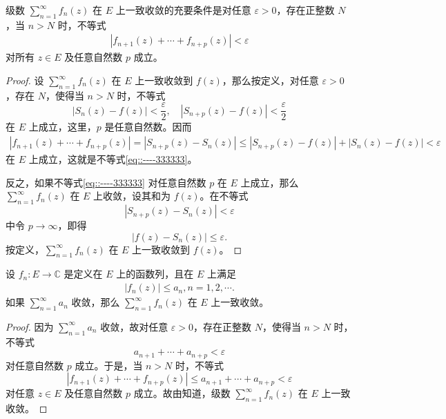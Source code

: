 \documentclass[../../main.tex]{subfiles}%
\begin{document}
\begin{theorem}\label{theorem:定理4.1.2}
级数 \( \sum_{n=1}^{\infty} f_n(z) \) 在 \( E \) 上一致收敛的充要条件是对任意 \( \varepsilon > 0 \)，存在正整数 \( N \)，当 \( n > N \) 时，不等式
\begin{align}
|f_{n + 1}(z) + \cdots + f_{n + p}(z)| < \varepsilon\label{eq::----333333}
\end{align}
对所有 \( z \in E \) 及任意自然数 \( p \) 成立。
\end{theorem}
\begin{proof}
设 \( \sum_{n=1}^{\infty} f_n(z) \) 在 \( E \) 上一致收敛到 \( f(z) \)，那么按定义，对任意 \( \varepsilon > 0 \)，存在 \( N \)，使得当 \( n > N \) 时，不等式
\[
|S_n(z) - f(z)| < \frac{\varepsilon}{2},
\quad
|S_{n + p}(z) - f(z)| < \frac{\varepsilon}{2}
\]
在 \( E \) 上成立，这里，\( p \) 是任意自然数。因而
\begin{align*}
|f_{n + 1}(z) + \cdots + f_{n + p}(z)| = |S_{n + p}(z) - S_n(z)| \leqslant |S_{n + p}(z) - f(z)| + |S_n(z) - f(z)| < \varepsilon
\end{align*}
在 \( E \) 上成立，这就是不等式\eqref{eq::----333333}。

反之，如果不等式\eqref{eq::----333333} 对任意自然数 \( p \) 在 \( E \) 上成立，那么 \( \sum_{n=1}^{\infty} f_n(z) \) 在 \( E \) 上收敛，设其和为 \( f(z) \)。在不等式
\[
|S_{n + p}(z) - S_n(z)| < \varepsilon
\]
中令 \( p \to \infty \)，即得
\[
|f(z) - S_n(z)| \leqslant \varepsilon.
\]
按定义，\( \sum_{n=1}^{\infty} f_n(z) \) 在 \( E \) 上一致收敛到 \( f(z) \)。
\end{proof}

\begin{theorem}[Weierstrass一致收敛判别法]\label{theorem:Weierstrass一致收敛判别法}
设 \( f_n: E \to \mathbb{C} \) 是定义在 \( E \) 上的函数列，且在 \( E \) 上满足
\begin{align*}
|f_n(z)| \leqslant a_n, n = 1, 2, \cdots .
\end{align*}
如果 \( \sum_{n=1}^{\infty} a_n \) 收敛，那么 \( \sum_{n=1}^{\infty} f_n(z) \) 在 \( E \) 上一致收敛。
\end{theorem}
\begin{proof}
因为 \( \sum_{n=1}^{\infty} a_n \) 收敛，故对任意 \( \varepsilon > 0 \)，存在正整数 \( N \)，使得当 \( n > N \) 时，不等式
\[
a_{n + 1} + \cdots + a_{n + p} < \varepsilon
\]
对任意自然数 \( p \) 成立。于是，当 \( n > N \) 时，不等式
\[
|f_{n + 1}(z) + \cdots + f_{n + p}(z)| \leqslant a_{n + 1} + \cdots + a_{n + p}
< \varepsilon
\]
对任意 \( z \in E \) 及任意自然数 \( p \) 成立。故由知道，级数 \( \sum_{n=1}^{\infty} f_n(z) \) 在 \( E \) 上一致收敛。
\end{proof}
\end{document}
